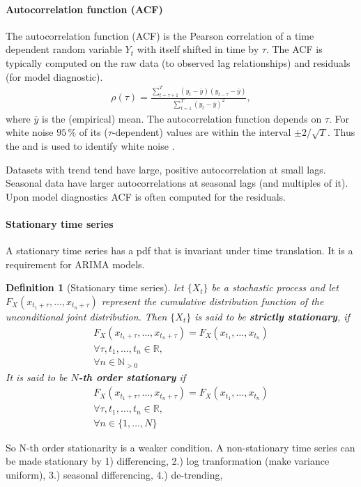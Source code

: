 \documentclass[12pt,a4paper]{article}
\newtheorem{definition}{Definition}
\begin{document}
\paragraph{Autocorrelation function (ACF)}
The autocorrelation function (ACF) is the Pearson correlation of a time dependent random variable $Y_t$ with itself shifted in time by $\tau$. The ACF is typically computed on the raw data (to observed lag relationships) and residuals (for model diagnostic).
\begin{align}
	\rho(\tau) =  \frac {\sum_{t=\tau+1} ^ T  \left(y_t - \bar y\right) \left(y_{t-\tau} - \bar y\right) }{\sum_{t=1} ^ T (y_t - \bar y)^2 },
\end{align}
where $\bar y$ is the (empirical) mean. The autocorrelation function depends on $\tau$. For white noise $95\,\%$ of its ($\tau$-dependent) values are within the interval $\pm2/\sqrt{T}$. Thus the  and is used to identify white noise \cite{hyndman_forecasting_principles_2018}. 

Datasets with trend tend have large, positive autocorrelation at small lags. Seasonal data have larger autocorrelations at seasonal lags (and multiples of it). Upon model diagnostics ACF is often computed for the residuals.
 
 \paragraph{Stationary time series} A stationary time series has a pdf that is invariant under time translation.  It is a requirement for ARIMA models.
 \begin{definition}[Stationary time series]
 	 let  $\{X_t\}$ be a stochastic process and let $ F_X(x_{t_1+\tau}, \dots,  x_{t_n+\tau})$
 represent the cumulative distribution function of the unconditional joint distribution. Then $\{X_t\}$  is said to be \textbf{strictly stationary}, if
 \begin{align}
 	F_X(x_{t_1+\tau}, \dots,  x_{t_n+\tau}) = F_X(x_{t_1}, \dots,  x_{t_n}) \\
 	 \forall \tau, t_1, \dots ,t_n\in \mathbb{R}, \nonumber \\
 	  \forall n \in \mathbb{N}_{>0} \nonumber
 \end{align}
 It is said to be\textbf{ $N$-th order stationary }if
 \begin{align}
 	F_X(x_{t_1+\tau}, \dots,  x_{t_n+\tau}) = F_X(x_{t_1}, \dots,  x_{t_n}) \\
 	\forall \tau, t_1, \dots ,t_n\in \mathbb{R}, \nonumber \\
 	\forall n \in \{1, \dots, N\} \nonumber
 \end{align}
 \end{definition}
 So N-th order stationarity is a weaker condition. 
 A non-stationary time series can be made stationary by 1) differencing, 
 	2.) log tranformation (make variance uniform),
 	3.) seasonal differencing,
 	4.) de-trending,
 
\end{document}
